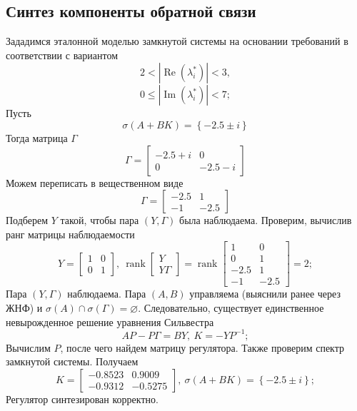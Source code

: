 \documentclass[a4paper, 12pt]{article}
\begin{document}
    \subsection{Синтез компоненты обратной связи}
    Зададимся эталонной моделью замкнутой системы на основании требований в соответствии с вариантом
    $$
    2<|\operatorname{Re}\left( \lambda_i^* \right)|<3,
    $$
    $$
    0\leq|\operatorname{Im}\left( \lambda_i^* \right)|<7;
    $$
    Пусть
    $$
    \sigma\left( A+BK \right)=\left\{ -2.5\pm i \right\}
    $$
    Тогда матрица $\Gamma$
    $$
    \Gamma=\begin{bmatrix}
        -2.5+i &0\\
        0 &-2.5-i
    \end{bmatrix}
    $$
    Можем переписать в вещественном виде
    $$
    \Gamma=\begin{bmatrix}
        -2.5 &1\\
        -1 &-2.5
    \end{bmatrix}
    $$
    Подберем $Y$ такой, чтобы пара $\left( Y,\Gamma \right)$ была наблюдаема.
    Проверим, вычислив ранг матрицы наблюдаемости
    $$
    Y=\begin{bmatrix}
        1 &0\\
        0 &1
    \end{bmatrix},\ \operatorname{rank}\begin{bmatrix}
        Y\\Y\Gamma
    \end{bmatrix}=\operatorname{rank}\begin{bmatrix}
    1         &0\\
         0    &1\\
   -2.5    &1\\
   -1   &-2.5
    \end{bmatrix}=2;
    $$
    Пара $\left( Y,\Gamma \right)$ наблюдаема.
    Пара $\left( A,B \right)$ управляема (выяснили ранее через ЖНФ)
    и $\sigma\left( A \right)\cap \sigma\left( \Gamma \right)=\varnothing$.
    Следовательно, существует единственное невырожденное решение уравнения
    Сильвестра
    $$
    AP-P\Gamma=BY,\ K=-YP^{-1};
    $$
    Вычислим $P$, после чего найдем матрицу регулятора. Также проверим спектр замкнутой системы. Получаем
    $$
    K=\begin{bmatrix}
        -0.8523    &0.9009\\
   -0.9312   &-0.5275
    \end{bmatrix},\ \sigma\left( A+BK \right)=\left\{ -2.5 \pm i \right\};
    $$
    Регулятор синтезирован корректно.
\end{document}
